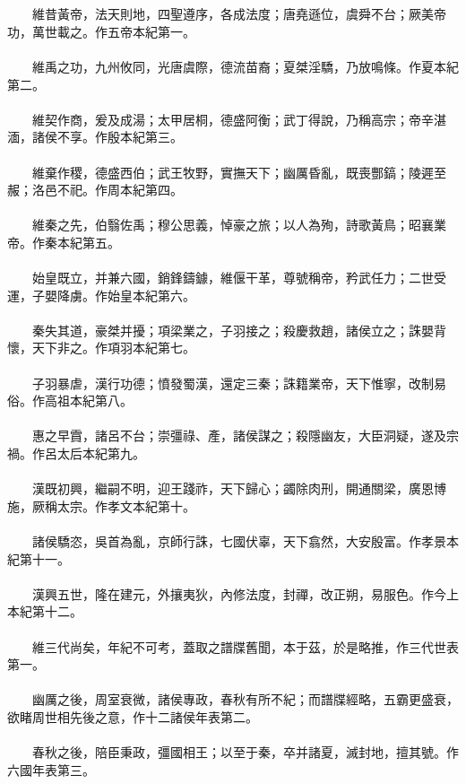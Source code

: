 \\\\
　　維昔黃帝，法天則地，四聖遵序，各成法度；唐堯遜位，虞舜不台；厥美帝功，萬世載之。作五帝本紀第一。
\\\\
　　維禹之功，九州攸同，光唐虞際，德流苗裔；夏桀淫驕，乃放鳴條。作夏本紀第二。
\\\\
　　維契作商，爰及成湯；太甲居桐，德盛阿衡；武丁得說，乃稱高宗；帝辛湛湎，諸侯不享。作殷本紀第三。
\\\\
　　維棄作稷，德盛西伯；武王牧野，實撫天下；幽厲昏亂，既喪酆鎬；陵遲至赧；洛邑不祀。作周本紀第四。
\\\\
　　維秦之先，伯翳佐禹；穆公思義，悼豪之旅；以人為殉，詩歌黃鳥；昭襄業帝。作秦本紀第五。
\\\\
　　始皇既立，并兼六國，銷鋒鑄鐻，維偃干革，尊號稱帝，矜武任力；二世受運，子嬰降虜。作始皇本紀第六。
\\\\
　　秦失其道，豪桀并擾；項梁業之，子羽接之；殺慶救趙，諸侯立之；誅嬰背懷，天下非之。作項羽本紀第七。
\\\\
　　子羽暴虐，漢行功德；憤發蜀漢，還定三秦；誅籍業帝，天下惟寧，改制易俗。作高祖本紀第八。
\\\\
　　惠之早霣，諸呂不台；崇彊祿、產，諸侯謀之；殺隱幽友，大臣洞疑，遂及宗禍。作呂太后本紀第九。
\\\\
　　漢既初興，繼嗣不明，迎王踐祚，天下歸心；蠲除肉刑，開通關梁，廣恩博施，厥稱太宗。作孝文本紀第十。
\\\\
　　諸侯驕恣，吳首為亂，京師行誅，七國伏辜，天下翕然，大安殷富。作孝景本紀第十一。
\\\\
　　漢興五世，隆在建元，外攘夷狄，內修法度，封禪，改正朔，易服色。作今上本紀第十二。
\\\\
　　維三代尚矣，年紀不可考，蓋取之譜牒舊聞，本于茲，於是略推，作三代世表第一。
\\\\
　　幽厲之後，周室衰微，諸侯專政，春秋有所不紀；而譜牒經略，五霸更盛衰，欲睹周世相先後之意，作十二諸侯年表第二。
\\\\
　　春秋之後，陪臣秉政，彊國相王；以至于秦，卒并諸夏，滅封地，擅其號。作六國年表第三。
